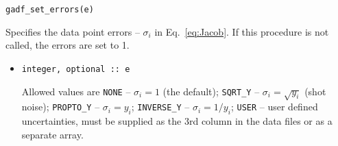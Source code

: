 \documentclass{article}
\begin{document}
\begin{verbatim}
gadf_set_errors(e)
\end{verbatim}
Specifies the data point errors -- $\sigma_i$ in Eq.~\eqref{eq:Jacob}. If this procedure is not called, the errors are set to 1.
\begin{itemize}
\item
\begin{verbatim}
integer, optional :: e
\end{verbatim}
  Allowed values are \verb+NONE+ -- $\sigma_i = 1$ (the default); \verb+SQRT_Y+ -- $\sigma_i = \sqrt{y_i}$ (shot noise); \verb+PROPTO_Y+ -- $\sigma_i = y_i$; \verb+INVERSE_Y+ -- $\sigma_i = 1/y_i$; \verb+USER+ -- user defined uncertainties, must be supplied as the 3rd column in the data files or as a separate array.
\end{itemize}
\end{document}
